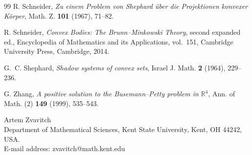 \documentclass[11pt]{article}
\theoremstyle{remark}
\newcommand{\R}{\mathbb{R}}
\begin{document}
\begin{thebibliography}{99}
R. Schneider,
\emph{Zu einem Problem von Shephard \"uber die Projektionen konvexer
K\"orper},
Math. Z. \textbf{101} (1967), 71--82.

R. Schneider,
\emph{Convex Bodies: The Brunn--Minkowski Theory}, second expanded ed.,
Encyclopedia of Mathematics and its Applications, vol.~151,
Cambridge University Press, Cambridge, 2014.

G.~C. Shephard,
\emph{Shadow systems of convex sets},
Israel J. Math. \textbf{2} (1964), 229--236.

G. Zhang,
\emph{A positive solution to the Busemann--Petty problem in $\R^4$},
Ann. of Math. (2) \textbf{149} (1999), 535--543.


\end{thebibliography}

\vspace{2mm}
\noindent Artem Zvavitch
\\
Department of Mathematical Sciences, Kent State University, Kent, OH 44242, USA. 
\\ E-mail address: zvavitch@math.kent.edu
\end{document}
